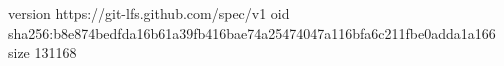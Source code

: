 version https://git-lfs.github.com/spec/v1
oid sha256:b8e874bedfda16b61a39fb416bae74a25474047a116bfa6c211fbe0adda1a166
size 131168
